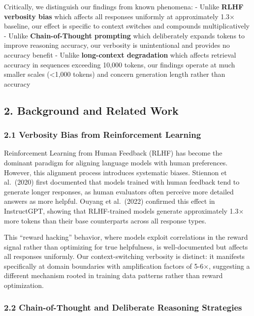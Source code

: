 \documentclass[
  11pt]{article}
\begin{document}
Critically, we distinguish our findings from known phenomena: - Unlike
\textbf{RLHF verbosity bias} which affects all responses uniformly at
approximately 1.3× baseline, our effect is specific to context switches
and compounds multiplicatively - Unlike \textbf{Chain-of-Thought
prompting} which deliberately expands tokens to improve reasoning
accuracy, our verbosity is unintentional and provides no accuracy
benefit - Unlike \textbf{long-context degradation} which affects
retrieval accuracy in sequences exceeding 10,000 tokens, our findings
operate at much smaller scales (\textless1,000 tokens) and concern
generation length rather than accuracy

\subsection{2. Background and Related
Work}\label{background-and-related-work}

\subsubsection{2.1 Verbosity Bias from Reinforcement
Learning}\label{verbosity-bias-from-reinforcement-learning}

Reinforcement Learning from Human Feedback (RLHF) has become the
dominant paradigm for aligning language models with human preferences.
However, this alignment process introduces systematic biases. Stiennon
et al.~(2020) first documented that models trained with human feedback
tend to generate longer responses, as human evaluators often perceive
more detailed answers as more helpful. Ouyang et al.~(2022) confirmed
this effect in InstructGPT, showing that RLHF-trained models generate
approximately 1.3× more tokens than their base counterparts across all
response types.

This ``reward hacking'' behavior, where models exploit correlations in
the reward signal rather than optimizing for true helpfulness, is
well-documented but affects all responses uniformly. Our
context-switching verbosity is distinct: it manifests specifically at
domain boundaries with amplification factors of 5-6×, suggesting a
different mechanism rooted in training data patterns rather than reward
optimization.

\subsubsection{2.2 Chain-of-Thought and Deliberate Reasoning
Strategies}\label{chain-of-thought-and-deliberate-reasoning-strategies}
\end{document}
